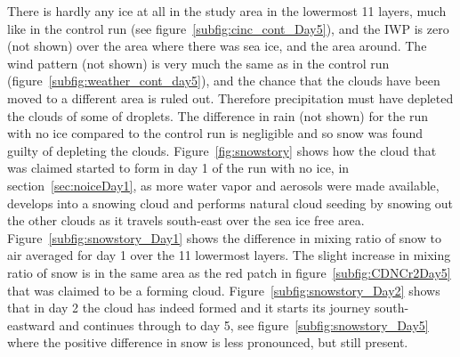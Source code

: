 There is hardly any ice at all in the study area in the lowermost 11 layers, much like in the control run (see figure~\ref{subfig:cinc_cont_Day5}), and the IWP is zero (not shown) over the area where there was sea ice, and the area around. The wind pattern (not shown) is very much the same as in the control run (figure~\ref{subfig:weather_cont_day5}), and the chance that the clouds have been moved to a different area is ruled out. Therefore precipitation must have depleted the clouds of some of droplets. The difference in rain (not shown) for the run with no ice compared to the control run is negligible and so snow was found guilty of depleting the clouds. Figure~\ref{fig:snowstory} shows how the cloud that was claimed started to form in day 1 of the run with no ice, in section~\ref{sec:noiceDay1}, as more water vapor and aerosols were made available, develops into a snowing cloud and performs natural cloud seeding by snowing out the other clouds as it travels south-east over the sea ice free area. Figure~\ref{subfig:snowstory_Day1} shows the difference in mixing ratio of snow to air averaged for day 1 over the 11 lowermost layers. The slight increase in mixing ratio of snow is in the same area as the red patch in figure~\ref{subfig:CDNCr2Day5} that was claimed to be a forming cloud. Figure~\ref{subfig:snowstory_Day2} shows that in day 2 the cloud has indeed formed and it starts its journey south-eastward and continues through to day 5, see figure~\ref{subfig:snowstory_Day5} where the positive difference in snow is less pronounced, but still present.

